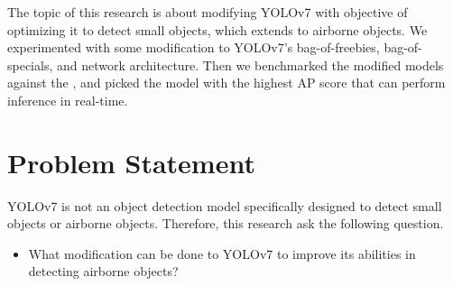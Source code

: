     The topic of this research is about modifying YOLOv7 with objective of optimizing it to detect
    small objects, which extends to airborne objects. We experimented with some modification to 
    YOLOv7's bag-of-freebies, bag-of-specials, and network architecture. Then we benchmarked the
    modified models against the \textcite{aot_dataset}, and picked the model with the highest AP score
    that can perform inference in real-time.





\section{Problem Statement}
    
    YOLOv7 is not an object detection model specifically designed to detect small objects or airborne objects.
    Therefore, this research ask the following question.
    \begin{itemize}
        \item What modification can be done to YOLOv7 to improve its abilities in detecting airborne objects?
    \end{itemize}

